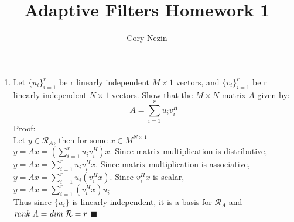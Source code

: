 \documentclass[12pt]{article}
\title{Adaptive Filters Homework 1}
\author{Cory Nezin}
\begin{document}
\maketitle
\begin{enumerate}
\item Let $\{u_i\}_{i=1}^r$ be r linearly independent $M \times 1$ vectors, and $\{v_i\}_{i=1}^r$ be r linearly independent $N\times 1$ vectors.  Show that the $M \times N$ matrix $A$ given by:
$$ A = \sum_{i=1}^r u_iv_i^H$$
Proof:\\
Let $y \in \mathcal{R}_A$, then for some $x\in M^{N\times 1}$\\
$y = Ax = \left(\sum_{i=1}^r u_iv_i^H\right)x$.  Since matrix multiplication is distributive,\\
$y = Ax = \sum_{i=1}^r u_iv_i^H x$.  Since matrix multiplication is associative,\\
$y = Ax = \sum_{i=1}^r u_i(v_i^H x)$.  Since $v_i^H x$ is scalar,\\
$y = Ax = \sum_{i=1}^r (v_i^Hx) u_i$\\
Thus since $\{u_i\}$ is linearly independent, it is a basis for $\mathcal{R}_A$ and\\
$\text{\it rank } A = \text{\it dim } \mathcal{R} = r$ $\blacksquare$
\end{enumerate}
\end{document}
